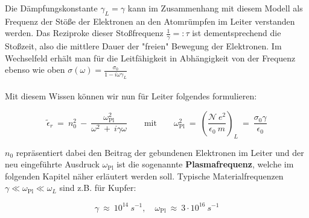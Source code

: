 Die Dämpfungskonstante $\gamma_L = \gamma$ kann im Zusammenhang mit diesem Modell als Frequenz der Stöße der Elektronen an den Atomrümpfen im Leiter verstanden werden. Das Reziproke dieser Stoßfrequenz $\frac{1}{\gamma}=: \tau$  ist dementsprechend die Stoßzeit, also die mittlere Dauer der "freien" Bewegung der Elektronen. Im Wechselfeld erhält man für die Leitfähigkeit in Abhängigkeit von der Frequenz ebenso wie oben $\sigma(\omega) = \frac{\sigma_0}{1-i\omega\gamma_L}$\\
\ \\
Mit diesem Wissen können wir nun für Leiter folgendes formulieren:

\begin{equation*}
\tilde{\epsilon}_r \ = \ n_0^2 \ - \ \frac{\omega_{\text{Pl}}^2}{\omega^2 \ + \ i\gamma\omega} \qquad \text{mit}\qquad \omega_{\text{Pl}}^2  \ = \  \left(\frac{\mathcal{N}\ e^2}{\epsilon_0 \ m}\right)_L \ = \ \frac{\sigma_0\gamma}{\epsilon_0}
\end{equation*}

$n_0$ repräsentiert dabei den Beitrag der gebundenen Elektronen im Leiter und der neu eingeführte Ausdruck $\omega_{\text{Pl}}$ ist die sogenannte \textbf{Plasmafrequenz}, welche im folgenden Kapitel näher erläutert werden soll. Typische Materialfrequenzen $\gamma\ll\omega_{\text{Pl}}\ll\omega_L$ sind z.B. für Kupfer:

\begin{equation*}
\gamma \ \approx \ 10^{14} \ s^{-1}, \quad \omega_{\text{Pl}} \ \approx \ 3\cdot 10^{16} \ s^{-1}
\end{equation*}

